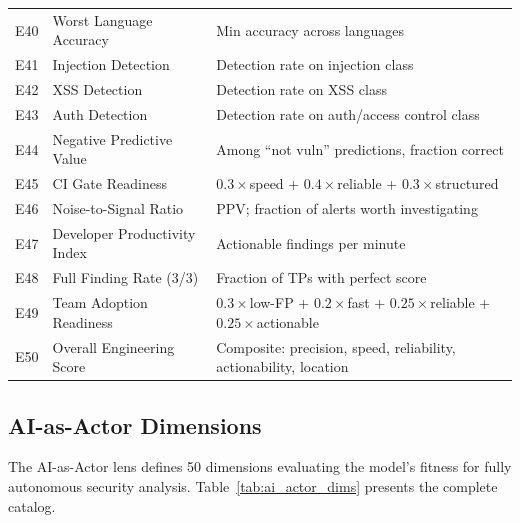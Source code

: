 \documentclass[10pt,twocolumn]{article}
\begin{document}
\begin{table}[t]
\begin{tabular}{@{}r l p{7.5cm}@{}}
E40 & Worst Language Accuracy             & Min accuracy across languages \\
E41 & Injection Detection                 & Detection rate on injection class \\
E42 & XSS Detection                       & Detection rate on XSS class \\
E43 & Auth Detection                      & Detection rate on auth/access control class \\
E44 & Negative Predictive Value           & Among ``not vuln'' predictions, fraction correct \\
E45 & CI Gate Readiness                   & $0.3{\times}$speed + $0.4{\times}$reliable + $0.3{\times}$structured \\
E46 & Noise-to-Signal Ratio               & PPV; fraction of alerts worth investigating \\
E47 & Developer Productivity Index        & Actionable findings per minute \\
E48 & Full Finding Rate (3/3)             & Fraction of TPs with perfect score \\
E49 & Team Adoption Readiness             & $0.3{\times}$low-FP + $0.2{\times}$fast + $0.25{\times}$reliable + $0.25{\times}$actionable \\
E50 & Overall Engineering Score           & Composite: precision, speed, reliability, actionability, location \\
\bottomrule
\end{tabular}
\end{table}

\subsection{AI-as-Actor Dimensions}
\label{sec:ai_actor_dims}

The AI-as-Actor lens defines 50 dimensions evaluating the model's fitness for fully autonomous security analysis. Table~\ref{tab:ai_actor_dims} presents the complete catalog.
\end{document}
